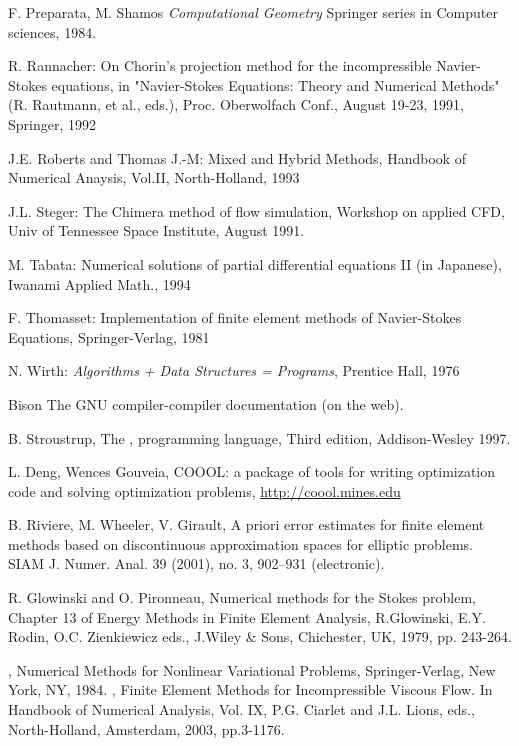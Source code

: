 \documentclass[a4paper,twoside,12pt]{book}
\begin{document}
\begin{thebibliography}{xx}
 {\sc  F. Preparata, M. Shamos} {\it Computational Geometry}
Springer series in Computer sciences, 1984.

 {\sc R. Rannacher}: On Chorin's projection method for the incompressible
Navier-Stokes equations, in "Navier-Stokes Equations: Theory and Numerical Methods" (R.
Rautmann, et al., eds.), Proc. Oberwolfach Conf., August 19-23, 1991, Springer, 1992

{\sc J.E. Roberts and Thomas J.-M}: Mixed and Hybrid Methods, Handbook of Numerical Anaysis, Vol.II, North-Holland, 1993

 {\sc J.L. Steger}: The Chimera method of flow simulation,
Workshop on applied CFD, Univ of Tennessee Space Institute, August 1991.

{\sc M. Tabata}: Numerical solutions of partial differential equations II  (in Japanese),
Iwanami Applied Math., 1994

{\sc F. Thomasset}: Implementation of finite element methods
of Navier-Stokes Equations, Springer-Verlag, 1981

 {\sc N. Wirth:} {\it Algorithms + Data Structures = Programs}, Prentice Hall,  1976


  {\sc Bison} The GNU compiler-compiler documentation (on the web).

{\sc B. Stroustrup}, 
The \Cpp, programming language, Third edition,
  Addison-Wesley 1997.

 {\sc L. Deng, Wences Gouveia}, COOOL: a package of tools for writing optimization code and solving optimization problems,
\url{http://coool.mines.edu}

 {\sc  B. Riviere, M.   Wheeler, V. Girault},
A priori error estimates for finite element
 methods based on discontinuous approximation spaces
 for elliptic problems.
  SIAM J. Numer. Anal. 39 (2001), no. 3, 902--931 (electronic).

 {\sc R. Glowinski and O. Pironneau}, Numerical methods for the Stokes
             problem, Chapter 13 of Energy Methods in Finite Element Analysis,
             R.Glowinski, E.Y. Rodin, O.C. Zienkiewicz eds., J.Wiley \& Sons, Chichester,
             UK, 1979, pp. 243-264.

, Numerical Methods for Nonlinear Variational Problems,
             Springer-Verlag, New York, NY, 1984.
, Finite Element Methods for Incompressible Viscous Flow. In
             Handbook of Numerical Analysis, Vol. IX, P.G. Ciarlet and J.L. Lions, eds.,
             North-Holland, Amsterdam, 2003, pp.3-1176.


\end{thebibliography}
\end{document}
